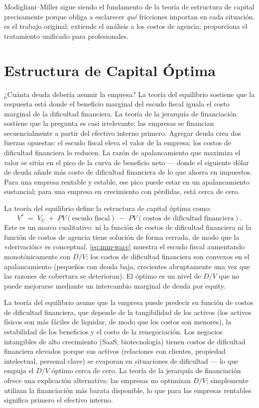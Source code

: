 Modigliani–Miller sigue siendo el fundamento de la teoría de estructura de capital precisamente porque
obliga a esclarecer \emph{qué} fricciones importan en cada situación. \textcite{modigliani1958capital}
es el trabajo original; \textcite{jensen1976agency} extiende el análisis a los costos de agencia;
\textcite{brealey2020} proporciona el tratamiento unificado para profesionales.

\section{Estructura de Capital Óptima}\label{sec:optimal-capital-structure}

¿Cuánta deuda debería asumir la empresa? La teoría del equilibrio sostiene que la respuesta está donde
el beneficio marginal del escudo fiscal iguala el costo marginal de la dificultad financiera. La teoría
de la jerarquía de financiación sostiene que la pregunta es casi irrelevante: las empresas se financian
secuencialmente a partir del efectivo interno primero. Agregar deuda crea dos fuerzas opuestas: el
escudo fiscal eleva el valor de la empresa; los costos de dificultad financiera lo reducen. La razón de
apalancamiento que maximiza el valor se sitúa en el pico de la curva de beneficio neto --- donde el
siguiente dólar de deuda añade más costo de dificultad financiera de lo que ahorra en impuestos. Para
una empresa rentable y estable, ese pico puede estar en un apalancamiento sustancial; para una empresa
en crecimiento con pérdidas, está cerca de cero.

La teoría del equilibrio define la estructura de capital óptima como:
\[
  V^* \;=\; V_U \;+\; PV(\text{escudo fiscal}) \;-\; PV(\text{costos de dificultad financiera}).
\]
Este es un marco cualitativo: ni la función de costos de dificultad financiera ni la función de costos
de agencia tiene solución de forma cerrada, de modo que la «derivación» es conceptual. \cref{eq:mm-wacc}
muestra el escudo fiscal aumentando monotónicamente con \(D/V\); los costos de dificultad financiera
son convexos en el apalancamiento (pequeños con deuda baja, crecientes abruptamente una vez que las
razones de cobertura se deterioran). El óptimo es un nivel de \(D/V\) que no puede mejorarse mediante
un intercambio marginal de deuda por equity.

La teoría del equilibrio asume que la empresa puede predecir su función de costos de dificultad
financiera, que depende de la tangibilidad de los activos (los activos físicos son más fáciles de
liquidar, de modo que los costos son menores), la estabilidad de los beneficios y el costo de la
renegociación. Los negocios intangibles de alto crecimiento (SaaS, biotecnología) tienen costos de
dificultad financiera elevados porque sus activos (relaciones con clientes, propiedad intelectual,
personal clave) se evaporan en situaciones de dificultad --- lo que empuja el \(D/V\) óptimo cerca
de cero. La teoría de la jerarquía de financiación ofrece una explicación alternativa: las empresas no
optimizan \(D/V\); simplemente utilizan la financiación más barata disponible, lo que para las
empresas rentables significa primero el efectivo interno.

